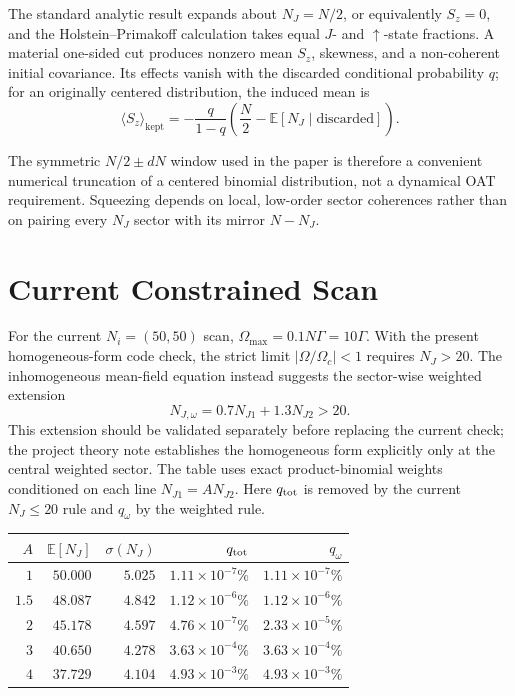 \documentclass[11pt]{article}
\begin{document}
The standard analytic result expands about $N_J=N/2$, or equivalently
$S_z=0$, and the Holstein--Primakoff calculation takes equal $J$- and
$\uparrow$-state fractions.  A material one-sided cut produces nonzero mean
$S_z$, skewness, and a non-coherent initial covariance.  Its effects vanish
with the discarded conditional probability $q$; for an originally centered
distribution, the induced mean is
\begin{equation}
  \langle S_z\rangle_{\mathrm{kept}}
  = -\frac{q}{1-q}
    \left(\frac{N}{2}
    - \mathbb E[N_J\mid\text{discarded}]\right).
\end{equation}

The symmetric $N/2\pm dN$ window used in the paper is therefore a convenient
numerical truncation of a centered binomial distribution, not a dynamical OAT
requirement.  Squeezing depends on local, low-order sector coherences rather
than on pairing every $N_J$ sector with its mirror $N-N_J$.

\section{Current Constrained Scan}

For the current $N_i=(50,50)$ scan,
$\Omega_{\max}=0.1N\Gamma=10\Gamma$.  With the present homogeneous-form code
check, the strict limit $\lvert\Omega/\Omega_c\rvert<1$ requires $N_J>20$.
The inhomogeneous mean-field equation instead suggests the sector-wise
weighted extension
\begin{equation}
  N_{J,\omega}=0.7N_{J1}+1.3N_{J2}>20.
\end{equation}
This extension should be validated separately before replacing the current
check; the project theory note establishes the homogeneous form explicitly
only at the central weighted sector.  The table uses exact product-binomial
weights conditioned on each line $N_{J1}=A N_{J2}$.  Here $q_{\rm tot}$ is
removed by the current $N_J\leq20$ rule and $q_\omega$ by the weighted rule.

\begin{center}
\begin{tabular}{@{}rrrrr@{}}
\toprule
$A$ & $\mathbb E[N_J]$ & $\sigma(N_J)$
& $q_{\rm tot}$ & $q_\omega$ \\
\midrule
$1$   & $50.000$ & $5.025$ & $1.11\times10^{-7}\%$ & $1.11\times10^{-7}\%$ \\
$1.5$ & $48.087$ & $4.842$ & $1.12\times10^{-6}\%$ & $1.12\times10^{-6}\%$ \\
$2$   & $45.178$ & $4.597$ & $4.76\times10^{-7}\%$ & $2.33\times10^{-5}\%$ \\
$3$   & $40.650$ & $4.278$ & $3.63\times10^{-4}\%$ & $3.63\times10^{-4}\%$ \\
$4$   & $37.729$ & $4.104$ & $4.93\times10^{-3}\%$ & $4.93\times10^{-3}\%$ \\
\bottomrule
\end{tabular}
\end{center}
\end{document}
